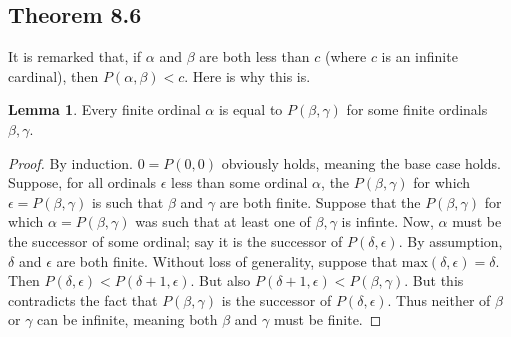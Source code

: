 \documentclass{article}
\theoremstyle{definition}
\newtheorem{lemma}[theorem]{Lemma}
\begin{document}
\subsection*{Theorem 8.6}
It is remarked that, if $\alpha$ and $\beta$ are both less than $c$ (where $c$ is an infinite cardinal), then $P(\alpha,\beta)<c$. Here is why 
this is.

\begin{lemma}
Every finite ordinal $\alpha$ is equal to $P(\beta,\gamma)$ for some finite ordinals $\beta,\gamma$.
\end{lemma}
\begin{proof}
By induction. $0=P(0,0)$ obviously holds, meaning the base case holds. Suppose, for all ordinals $\epsilon$
less than some ordinal $\alpha$, the $P(\beta,\gamma)$ for which $\epsilon=P(\beta,\gamma)$ is such that 
$\beta$ and $\gamma$ are both finite. Suppose that the $P(\beta,\gamma)$ for which 
$\alpha=P(\beta,\gamma)$ was such that at least one of $\beta,\gamma$ is infinte.
Now, $\alpha$ must be the successor of some ordinal; 
say it is the successor of $P(\delta,\epsilon)$. By assumption, $\delta$ and $\epsilon$ are both finite. 
Without loss of generality, suppose that $\textrm{max}(\delta,\epsilon)=\delta$. Then 
$P(\delta,\epsilon)<P(\delta+1,\epsilon)$. But also 
$P(\delta+1,\epsilon)<P(\beta,\gamma)$. But this contradicts the fact that 
$P(\beta,\gamma)$ is the successor of $P(\delta,\epsilon)$. Thus neither of $\beta$ or $\gamma$ can 
be infinite, meaning both $\beta$ and $\gamma$ must be finite.
\end{proof}
\end{document}
